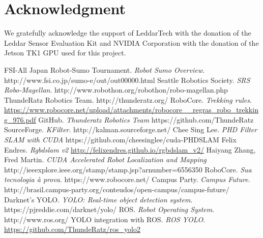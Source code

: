 \documentclass[conference]{IEEEtran}
\begin{document}
\section*{Acknowledgment}
We gratefully acknowledge the support of LeddarTech with the donation of the
Leddar Sensor Evaluation Kit and NVIDIA Corporation with the donation of
the Jetson TK1 GPU used for this project.

\begin{thebibliography}{30}
    FSI-All Japan Robot-Sumo Tournament. \emph{Robot Sumo Overview}. http://www.fsi.co.jp/sumo-e/out/out00000.html
    Seattle Robotics Society. \emph{SRS Robo-Magellan}. http://www.robothon.org/robothon/robo-magellan.php
    ThundeRatz Robotics Team. http://thunderatz.org/
    RoboCore. \emph{Trekking rules}. \url{https://www.robocore.net/upload/attachments/robocore__regras_robo_trekking_976.pdf}
    GitHub. \emph{Thunderatz Robotics Team} https://github.com/ThundeRatz
    SourceForge. \emph{KFilter}. http://kalman.sourceforge.net/
    Chee Sing Lee. \emph{PHD Filter SLAM with CUDA} https://github.com/cheesinglee/cuda-PHDSLAM
    Felix Endres. \emph{Rgbdslam v2} \url{http://felixendres.github.io/rgbdslam_v2/}
    Haiyang Zhang, Fred Martin. \emph{CUDA Accelerated Robot Localization and Mapping}
    http://ieeexplore.ieee.org/stamp/stamp.jsp?arnumber=6556350
    RoboCore. \emph{Sua tecnologia à prova}. https://www.robocore.net/
    Campus Party. \emph{Campus Future}. http://brasil.campus-party.org/conteudos/open-campus/campus-future/
    Darknet's YOLO. \emph{YOLO: Real-time object detection system}. https://pjreddie.com/darknet/yolo/
    ROS. \emph{Robot Operating System}. http://www.ros.org/
    YOLO integration with ROS. \emph{ROS YOLO}. \url{https://github.com/ThundeRatz/ros_yolo2}

\end{thebibliography}
\end{document}
